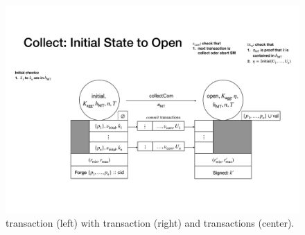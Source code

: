\begin{figure}[t!]

  \centering


  \includegraphics[width=\textwidth/2]{figures/SM_initial_open.pdf}

  \caption{\mtxInit{} transaction (left) with \mtxCCom{} transaction
    (right) and \mtxCom{} transactions (center).}
  \label{fig:SM_initial_open}

\end{figure}



